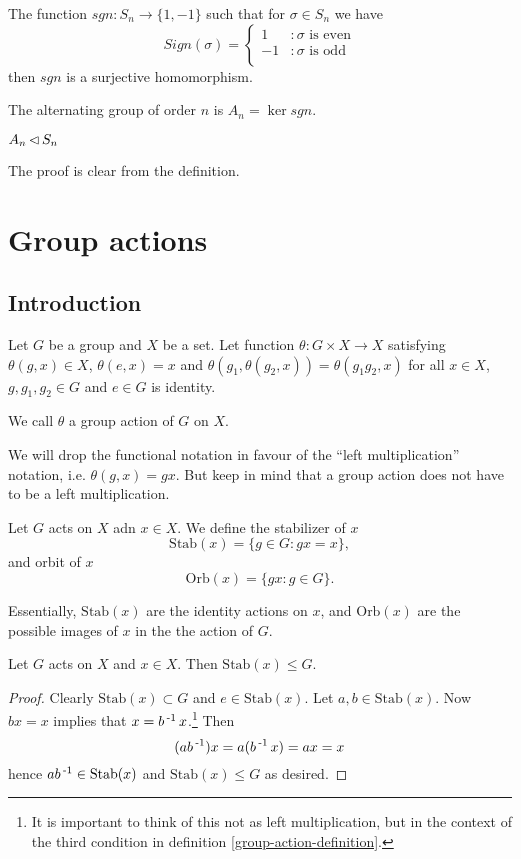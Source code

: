 \documentclass[12pt]{article}
\newcommand\stab{\text{Stab}}
\newcommand\orb{\text{Orb}}
\begin{document}
	\begin{theorem}
		The function $sgn:S_n \to \{1,-1\}$ such that for $\sigma \in S_n$ we have
		$$
		Sign(\sigma) = 
		\begin{cases}
			1 &: \sigma \text{ is even}\\
			-1 &: \sigma \text{ is odd}\\
		\end{cases}
		$$
		then $sgn$ is a surjective homomorphism.
	\end{theorem}

	\begin{define}
		The alternating group of order $n$ is $A_n = \ker sgn$.
	\end{define}

	\begin{theorem}
		$A_n \operatorname{\vartriangleleft} S_n$
	\end{theorem}
	The proof is clear from the definition.

\newpage
\section{Group actions}
\subsection{Introduction}
	\begin{define}\label{group-action-definition}
		Let $G$ be a group and $X$ be a set. Let function $\theta : G\times X \to X$ satisfying $\theta(g,x) \in X$, $\theta(e,x) = x$ and $\theta(g_1,\theta(g_2,x)) = \theta(g_1g_2,x)$ for all $x\in X$, $g,g_1,g_2\in G$ and $e\in G$ is identity.

		We call $\theta$ a group action of $G$ on $X$.
	\end{define}

	We will drop the functional notation in favour of the ``left multiplication'' notation, i.e. $\theta(g,x) = gx$. But keep in mind that a group action does not have to be a left multiplication.

	\begin{define}
		Let $G$ acts on $X$ adn $x\in X$. We define the stabilizer of $x$ 
		$$\stab(x) = \{g\in G : gx=x\},$$
		and orbit of $x$
		$$\orb(x) = \{gx : g\in G\}.$$
	\end{define}

	Essentially, $\stab(x)$ are the identity actions on $x$, and $\orb(x)$ are the possible images of $x$ in the the action of $G$.

	\begin{theorem}
		Let $G$ acts on $X$ and $x\in X$. Then $\stab(x)\leq G$.
	\end{theorem}
	\begin{proof}
		Clearly $\stab(x) \subset G$ and $e\in \stab(x)$. Let $a,b\in \stab(x)$. Now $bx=x$ implies that $x=b\operatorname{^{-1}} x$.\footnote{It is important to think of this not as left multiplication, but in the context of the third condition in definition \ref{group-action-definition}.} Then
		$$(ab\operatorname{^{-1}}) x = a(b\operatorname{^{-1}} x) = ax = x$$
		hence $ab\inv \in \stab(x)$ and $\stab(x)\leq G$ as desired.
	\end{proof}
\end{document}
